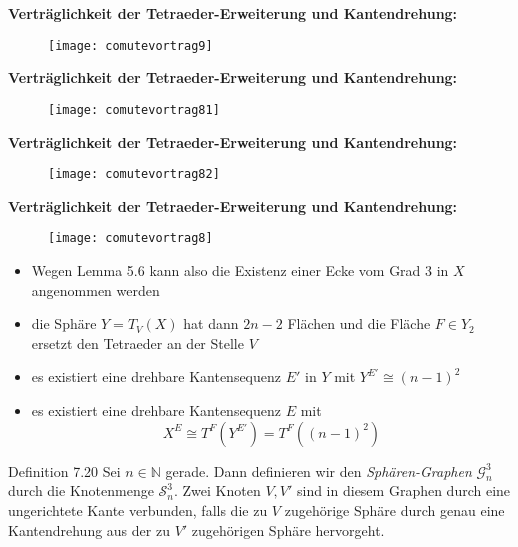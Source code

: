 \documentclass{beamer}
\begin{document}
\begin{frame}
\textbf{Verträglichkeit der Tetraeder-Erweiterung und Kantendrehung:}
\begin{figure}[H]
\texttt{[image: comutevortrag9]}
\end{figure}
\end{frame}
\begin{frame}
\textbf{Verträglichkeit der Tetraeder-Erweiterung und Kantendrehung:}
\begin{figure}[H]
\texttt{[image: comutevortrag81]}
\end{figure}
\end{frame}
\begin{frame}
\textbf{Verträglichkeit der Tetraeder-Erweiterung und Kantendrehung:}
\begin{figure}[H]
\texttt{[image: comutevortrag82]}
\end{figure}
\end{frame}
\begin{frame}
\textbf{Verträglichkeit der Tetraeder-Erweiterung und Kantendrehung:}
\begin{figure}[H]
\texttt{[image: comutevortrag8]}
\end{figure}
\end{frame}
\begin{frame}
\begin{itemize}
\item Wegen Lemma 5.6 kann also die Existenz einer Ecke vom Grad 3 in $X$ angenommen werden
\item die Sphäre $Y=T_V(X)$ hat dann $2n-2$ Flächen und die Fläche $F\in Y_2$ ersetzt den Tetraeder an der Stelle $V$
\item es existiert eine drehbare Kantensequenz $E'$ in $Y$ mit $Y^{E'}\cong (n-1)^2$  
\item es existiert eine drehbare Kantensequenz $E$ mit 
\[
X^{E}\cong T^F(Y^{E'})=T^F((n-1)^2)
\] 
\end{itemize}
\end{frame}
\begin{frame}
\begin{block}{Definition 7.20}
Sei $n\in \mathbb{N}$ gerade. Dann definieren wir den \emph{Sphären-Graphen} $\mathcal{G}^3_n$ durch die Knotenmenge $\mathcal{S}^3_n.$ Zwei Knoten $V,V'$ sind in diesem Graphen durch eine ungerichtete Kante verbunden, falls die zu $V$ zugehörige Sphäre durch genau eine Kantendrehung aus der zu $V'$ zugehörigen Sphäre hervorgeht. 
\end{block}
\end{frame}
\end{document}
